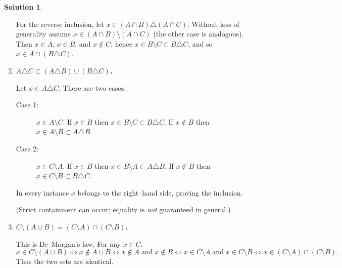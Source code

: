 \documentclass[12pt]{article}
\theoremstyle{definition} %
\newtheorem{solution}{Solution}
\theoremstyle{plain} %
\begin{document}
\begin{solution}
\begin{enumerate}[label=(\alph*)]
  For the reverse inclusion, let
  \(x\in (A\cap B)\triangle(A\cap C)\).
  Without loss of generality assume
  \(x\in(A\cap B)\setminus(A\cap C)\)
  (the other case is analogous).
  Then $x\in A$, $x\in B$, and $x\notin C$; hence
  \(x\in B\setminus C\subset B\triangle C\),
  and so \(x\in A\cap(B\triangle C)\).
  
  \item \textbf{$A\triangle C\subset (A\triangle B)\cup(B\triangle C)$.}
  
  Let $x\in A\triangle C$.  There are two cases.
  
  \begin{description}
    \item[Case 1:] $x\in A\setminus C$.  
          If $x\in B$ then $x\in B\setminus C\subset B\triangle C$.
          If $x\notin B$ then $x\in A\setminus B\subset A\triangle B$.
    \item[Case 2:] $x\in C\setminus A$.  
          If $x\in B$ then $x\in B\setminus A\subset A\triangle B$.
          If $x\notin B$ then $x\in C\setminus B\subset B\triangle C$.
  \end{description}
  In every instance $x$ belongs to the right--hand side, proving the inclusion.
  
  (Strict containment can occur; equality is \emph{not} guaranteed in general.)
  
  \item \textbf{$C\setminus(A\cup B) = (C\setminus A)\cap(C\setminus B)$.}
  
  This is De~Morgan’s law.  
  For any $x\in C$:
  \[
  x\in C\setminus(A\cup B)
  \iff
  x\notin A\cup B
  \iff
  x\notin A\;\text{and}\;x\notin B
  \iff
  x\in C\setminus A\;\text{and}\;x\in C\setminus B
  \iff
  x\in(C\setminus A)\cap(C\setminus B).
  \]
  Thus the two sets are identical.
  
  \end{enumerate}
  \end{solution}
\end{document}
